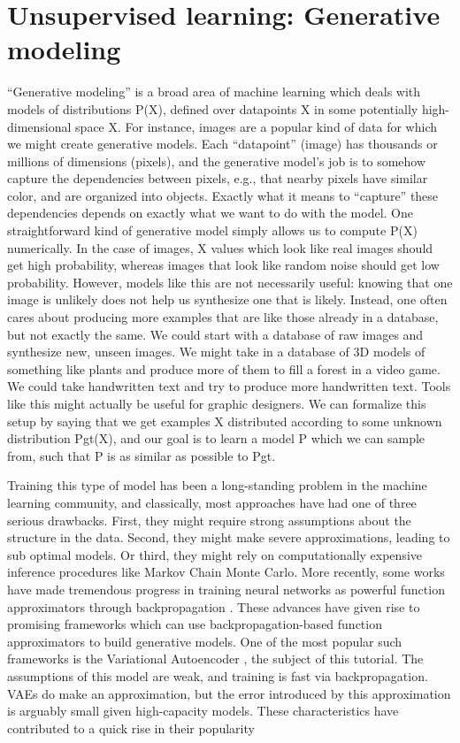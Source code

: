 \section{Unsupervised learning: Generative modeling}
“Generative modeling” is a broad area of machine learning which deals with models of distributions P(X), defined over datapoints X in some potentially high-dimensional space X. For instance, images are a popular kind of data for which we might create generative models. Each “datapoint” (image) has thousands or millions of dimensions (pixels), and the generative model’s job is to somehow capture the dependencies between pixels, e.g., that nearby
pixels have similar color, and are organized into objects. Exactly what it means to “capture” these dependencies depends on exactly what we want to do with the model. One straightforward kind of generative model simply allows us to compute P(X) numerically. In the case of images, X values  which look like real images should get high probability, whereas images that look like random noise should get low probability. However, models like this are not necessarily useful: knowing that one image is unlikely does not help us synthesize one that is likely. Instead, one often cares about producing more examples that are like those already in a database, but not exactly the same. We could start with a database of raw images and synthesize new, unseen images. We might take in a database of 3D models of something like plants and produce more of them to fill a forest in a video game. We could take handwritten text and try to produce more handwritten text. Tools like this might actually be useful for graphic designers. We can formalize this setup by saying that we get examples X distributed according to some unknown distribution Pgt(X), and our goal is to learn a model P which we can sample from, such that P is as similar as possible to Pgt.

Training this type of model has been a long-standing problem in the machine learning community, and classically, most approaches have had one of three serious drawbacks. First, they might require strong assumptions about the structure in the data. Second, they might make severe approximations, leading to sub optimal models. Or third, they might rely on computationally expensive inference procedures like Markov Chain Monte Carlo. More recently, some works have made tremendous progress in training neural networks as powerful function approximators through backpropagation \cite{NIPS2012_4824}. These advances have given rise to promising frameworks which can use backpropagation-based function approximators to build generative models. One of the most popular such frameworks is the Variational Autoencoder \cite{}, the subject of this tutorial. The assumptions of this model are weak, and training is fast via backpropagation. VAEs do make an approximation, but the error introduced by this approximation is arguably small given high-capacity models. These characteristics have contributed to a quick rise in their popularity

